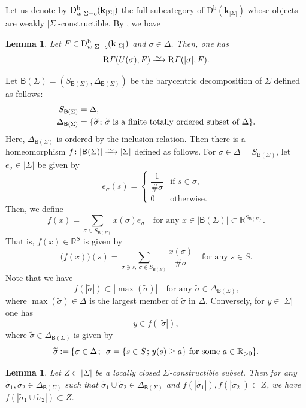 \documentclass[11pt]{article}
\numberwithin{equation}{section}
\newcommand{\isom}{\xrightarrow{{\raisebox{-.6ex}[0ex][0ex]{$\mspace{1mu}\textstyle\sim\mspace{2mu}$}}}}
\let\cl\colon
\let \tilde\oldtilde
\let\tilde\widetilde
\newcommand{\semicolon}{\nobreak \mskip2mu\mathpunct{}\nonscript\mkern-\thinmuskip{;}\mskip6mu plus1mu\relax}
\newcommand{\set}[2]{{\left\{#1\semicolon #2 \right\}}}
\newcommand{\bl}{\bigl(}
\newcommand{\br}{\bigr)}
\theoremstyle{plain}
\newtheorem{lemma}[theorem]{Lemma}
\theoremstyle{definition}
\newcommand{\R}{\mathbb{R}}
\newcommand{\derived}[1]{\mathrm{#1}}
\newcommand{\derd}{\derived{D}}
\newcommand{\derr}{\derived{R}}
\newcommand{\BDC}{\derd^{\mathrm{b}}}
\newcommand{\field}{\mathbf{k}}\let\cor\field
\newcommand{\rsect}{\derr\varGamma}
\newcommand{\Bd}{\mathsf{B}}
\newcommand{\defeq}{\mathbin{:=}}\let \seteq\defeq
\begin{document}
Let us denote by $\BDC_{w\text-\Sigma-c}(\field_{|\Sigma|})$ the full subcategory of $\BDC(\field_{|\Sigma|})$ whose objects are weakly $|\Sigma|$-constructible.
By \cite[Prop.\,8.1.4]{KS90}, we have

\begin{lemma} \label{lem:Usigma}
Let $F\in\BDC_{w\text-\Sigma-c}(\field_{|\Sigma|})$ and $\sigma\in\Delta$. Then, one has
\[\rsect(U(\sigma);F)\isom\rsect(|\sigma|;F).\]
\end{lemma}

Let $\Bd(\Sigma)=(S_{\Bd(\Sigma)}, \Delta_{\Bd(\Sigma)})$ be the barycentric
decomposition of $\Sigma$ defined as follows:
\begin{align*}
S_{\Bd(\Sigma)}&=\Delta,\\
\Delta_{\Bd(\Sigma)}&=\set{\tilde\sigma}
{\text{$\tilde\sigma$ is a finite totally ordered subset of $\Delta$}}.
\end{align*}
Here, $\Delta_{\Bd(\Sigma)}$ is ordered by the inclusion relation.
Then there is a homeomorphism
$f\cl|\Bd(\Sigma)|\isom |\Sigma|$
defined as follows.
For $\sigma\in\Delta=S_{\Bd(\Sigma)}$, let $e_\sigma\in|\Sigma|$ be given by
\[e_\sigma(s)=
\begin{cases}
\dfrac{1}{\#\sigma}&\text{if $s\in\sigma$,}\\[1ex]
0&\text{otherwise.}
\end{cases}
\]
Then, we define\vspace*{-3pt}
\[
f(x)=\sum_{\sigma\in S_{\Bd(\Sigma)}}x(\sigma)e_{\sigma}
\quad\text{for any $x\in |\Bd(\Sigma)|\subset\R^{S_{\Bd(\Sigma)}}$.}
\]
That is, $f(x)\in\R^S$ is given by\vspace*{-3pt}
\[
\bl f(x)\br(s)=\sum_{\sigma\owns s,\ \sigma\in S_{\Bd(\Sigma)}}\dfrac{x(\sigma)}{\#\sigma}
\quad\text{for any $s\in S$.}
\]
Note that we have\vspace*{-3pt}
\begin{equation}
f(|\tilde\sigma|)\subset |\max(\tilde\sigma)|\quad\text{for any $\tilde\sigma\in \Delta_{\Bd(\Sigma)}$,}\label{eq:bary}
\end{equation}
where $\max(\tilde\sigma)\in\Delta$ is the largest member of $\tilde\sigma$ in $\Delta$.
Conversely, for $y\in|\Sigma|$ one has\vspace*{-3pt}
\[y\in f(|\tilde\sigma|),\]
where $\tilde\sigma\in\Delta_{\Bd(\Sigma)}$ is given by
\[\tilde\sigma\defeq\set{\sigma\in\Delta}{\text{
$\sigma=\set{s\in S}{y(s)\ge a}$
for some $a\in\R_{>0}$}}.\]

\begin{lemma}\label{sublemma}
Let $Z\subset|\Sigma|$ be a locally closed $\Sigma$-constructible subset.
Then for any
$\tilde\sigma_1,\tilde\sigma_2\in \Delta_{\Bd(\Sigma)}$ such that
$\tilde\sigma_1\cup\tilde\sigma_2\in\Delta_{\Bd(\Sigma)}$ and
$f(|\tilde\sigma_1|),f(|\tilde\sigma_2|)\subset Z$,
we have
\hbox{$f(|\tilde\sigma_1\cup\tilde\sigma_2|)\subset Z$}.
\end{lemma}
\end{document}
